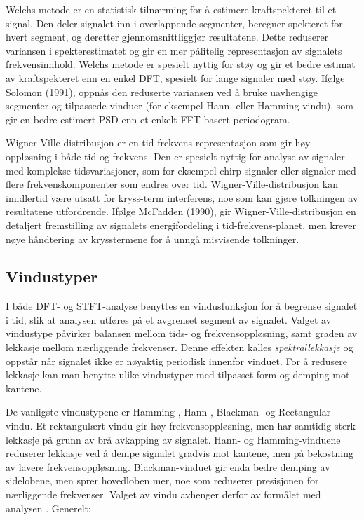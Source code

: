 Welchs metode er en statistisk tilnærming for å estimere kraftspekteret til et signal. Den deler signalet inn i overlappende segmenter, beregner spekteret for hvert segment, 
og deretter gjennomsnittliggjør resultatene. Dette reduserer variansen i spekterestimatet og gir en mer pålitelig representasjon av signalets frekvensinnhold. Welchs 
metode er spesielt nyttig for støy og gir et bedre estimat av kraftspekteret enn en enkel DFT, spesielt for lange signaler med støy. Ifølge Solomon (1991), oppnås den 
reduserte variansen ved å bruke uavhengige segmenter og tilpassede vinduer (for eksempel Hann- eller Hamming-vindu), som gir en bedre estimert PSD enn et enkelt 
FFT-basert periodogram. \parencite{solomon_psd_welch_1991}

Wigner-Ville-distribusjon er en tid-frekvens representasjon som gir høy oppløsning i både tid og frekvens. Den er spesielt nyttig for analyse av signaler med
komplekse tidsvariasjoner, som for eksempel chirp-signaler eller signaler med flere frekvenskomponenter som endres over tid. Wigner-Ville-distribusjon kan imidlertid 
være utsatt for kryss-term interferens, noe som kan gjøre tolkningen av resultatene utfordrende. Ifølge McFadden (1990), gir Wigner-Ville-distribusjon en detaljert 
fremstilling av signalets energifordeling i tid-frekvens-planet, men krever nøye håndtering av krysstermene for å unngå misvisende tolkninger.
\parencite{mcfadden_intro_wigner-ville_1990}

\subsection{Vindustyper}
I både DFT- og STFT-analyse benyttes en vindusfunksjon for å begrense signalet i tid, slik at 
analysen utføres på et avgrenset segment av signalet. Valget av vindustype påvirker 
balansen mellom tids- og frekvensoppløsning, samt graden av lekkasje mellom nærliggende 
frekvenser. Denne effekten kalles \emph{spektrallekkasje} og oppstår når signalet ikke er 
nøyaktig periodisk innenfor vinduet. For å redusere lekkasje kan man benytte ulike vindustyper 
med tilpasset form og demping mot kantene.

De vanligste vindustypene er Hamming-, Hann-, Blackman- og Rectangular-vindu. 
Et rektangulært vindu gir høy frekvensoppløsning, men har samtidig sterk 
lekkasje på grunn av brå avkapping av signalet. 
Hann- og Hamming-vinduene reduserer lekkasje ved å dempe signalet gradvis mot 
kantene, men på bekostning av lavere frekvensoppløsning. 
Blackman-vinduet gir enda bedre demping av sidelobene, men sprer hovedloben mer, 
noe som reduserer presisjonen for nærliggende frekvenser. 
Valget av vindu avhenger derfor av formålet med analysen \parencite{harris_windows_1978}. 
Generelt:

